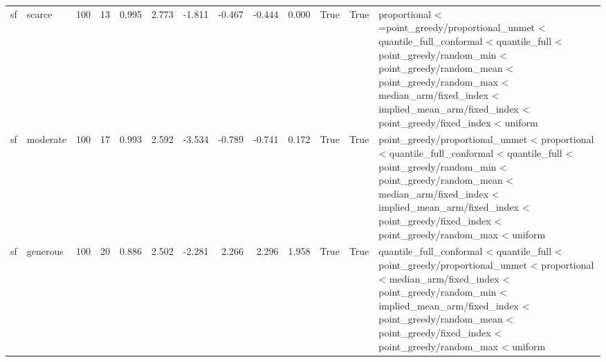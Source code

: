 \begin{tabular}{llrrrrrrrrrrl}
sf & scarce & 100 & 13 & 0.995 & 2.773 & -1.811 & -0.467 & -0.444 & 0.000 & True & True & proportional < =point\_greedy/proportional\_unmet < quantile\_full\_conformal < quantile\_full < point\_greedy/random\_min < point\_greedy/random\_mean < point\_greedy/random\_max < median\_arm/fixed\_index < implied\_mean\_arm/fixed\_index < point\_greedy/fixed\_index < uniform \\
sf & moderate & 100 & 17 & 0.993 & 2.592 & -3.534 & -0.789 & -0.741 & 0.172 & True & True & point\_greedy/proportional\_unmet < proportional < quantile\_full\_conformal < quantile\_full < point\_greedy/random\_min < point\_greedy/random\_mean < median\_arm/fixed\_index < implied\_mean\_arm/fixed\_index < point\_greedy/fixed\_index < point\_greedy/random\_max < uniform \\
sf & generous & 100 & 20 & 0.886 & 2.502 & -2.281 & 2.266 & 2.296 & 1.958 & True & True & quantile\_full\_conformal < quantile\_full < point\_greedy/proportional\_unmet < proportional < median\_arm/fixed\_index < point\_greedy/random\_min < implied\_mean\_arm/fixed\_index < point\_greedy/random\_mean < point\_greedy/fixed\_index < point\_greedy/random\_max < uniform \\
\bottomrule
\end{tabular}
